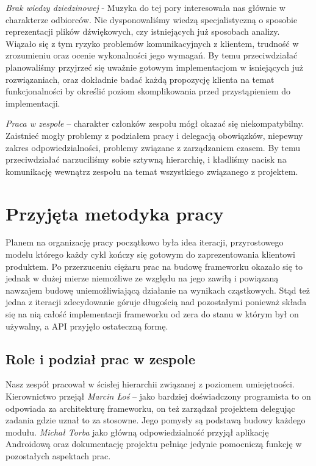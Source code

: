 \noindent\emph{Brak wiedzy dziedzinowej} - Muzyka do tej pory interesowała nas głównie w charakterze odbiorców. Nie dysponowaliśmy wiedzą specjalistyczną o sposobie reprezentacji plików dźwiękowych, czy istniejących już sposobach analizy. Wiązało się z tym ryzyko problemów komunikacyjnych z klientem, trudność w zrozumieniu oraz ocenie wykonalności jego wymagań. By temu przeciwdziałać planowaliśmy przyjrzeć się uważnie gotowym implementacjom w isniejących już rozwiązaniach, oraz dokładnie badać każdą propozycję klienta na temat funkcjonalności by określić poziom skomplikowania przed przystąpieniem do implementacji.

\noindent\emph{Praca w zespole} -- charakter członków zespołu mógł okazać się niekompatybilny. Zaistnieć mogły problemy z podziałem pracy i delegacją obowiązków, niepewny zakres odpowiedzialności, problemy związane z zarządzaniem czasem. By temu przeciwdziałać narzuciliśmy sobie sztywną hierarchię, i kładliśmy nacisk na komunikację wewnątrz zespołu na temat wszystkiego związanego z projektem.

\chapter{Przyjęta metodyka pracy}

Planem na organizację pracy początkowo była idea iteracji, przyrostowego modelu którego każdy cykl
kończy się gotowym do zaprezentowania klientowi produktem. Po przerzuceniu ciężaru prac na budowę
frameworku okazało się to jednak w dużej mierze niemożliwe ze względu na jego zawiłą i powiązaną
nawzajem budowę uniemożliwiającą działanie na wynikach cząstkowych. Stąd też jedna z iteracji
zdecydowanie góruje długością nad pozostałymi ponieważ składa się na nią całość implementacji
frameworku od zera do stanu w którym był on używalny, a API przyjęło ostateczną formę.

\section{Role i podział prac w zespole}

Nasz zespół pracował w ścisłej hierarchii związanej z poziomem umiejętności. Kierownictwo przejął
\emph{Marcin Łoś} -- jako bardziej doświadczony programista to on odpowiada za architekturę frameworku, on też zarządzał projektem delegując zadania gdzie uznał to za stosowne. Jego pomysły są podstawą budowy każdego modułu. \emph{Michał Torba} jako
główną odpowiedzialność przyjął aplikację Androidową oraz dokumentację projektu pełniąc jedynie
pomocniczą funkcję w pozostałych aspektach prac.

